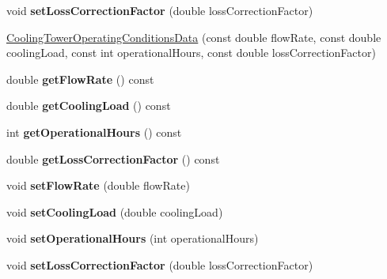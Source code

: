 \begin{DoxyCompactItemize}
void {\bfseries set\+Loss\+Correction\+Factor} (double loss\+Correction\+Factor)
\item 
\hyperlink{class_cooling_tower_operating_conditions_data_a51e6445c137db249bdc8d02ff1e1b7ff}{Cooling\+Tower\+Operating\+Conditions\+Data} (const double flow\+Rate, const double cooling\+Load, const int operational\+Hours, const double loss\+Correction\+Factor)
\item 
\mbox{\label{class_cooling_tower_operating_conditions_data_a6f61a2d4acaeedb86d534657c5fd8de6}} 
double {\bfseries get\+Flow\+Rate} () const
\item 
\mbox{\label{class_cooling_tower_operating_conditions_data_a3557f2c4d06aef39d8296438d0261b85}} 
double {\bfseries get\+Cooling\+Load} () const
\item 
\mbox{\label{class_cooling_tower_operating_conditions_data_a972d60974ad3d3cfb52068e6dbd27407}} 
int {\bfseries get\+Operational\+Hours} () const
\item 
\mbox{\label{class_cooling_tower_operating_conditions_data_ac071130167f5137c485f4ca9c60d1f78}} 
double {\bfseries get\+Loss\+Correction\+Factor} () const
\item 
\mbox{\label{class_cooling_tower_operating_conditions_data_a179ec1a769718787f3acc645624717c6}} 
void {\bfseries set\+Flow\+Rate} (double flow\+Rate)
\item 
\mbox{\label{class_cooling_tower_operating_conditions_data_a42559352dc04a59ce0b9f50dd1591e84}} 
void {\bfseries set\+Cooling\+Load} (double cooling\+Load)
\item 
\mbox{\label{class_cooling_tower_operating_conditions_data_a77c481059c024d9606d9d88426557162}} 
void {\bfseries set\+Operational\+Hours} (int operational\+Hours)
\item 
\mbox{\label{class_cooling_tower_operating_conditions_data_ac858a4d26003900b8cd9c53e257f6009}} 
void {\bfseries set\+Loss\+Correction\+Factor} (double loss\+Correction\+Factor)
\end{DoxyCompactItemize}


